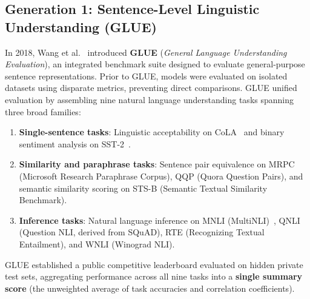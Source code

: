 \documentclass[../../../main.tex]{subfiles}
\begin{document}
\subsection{Generation 1: Sentence-Level Linguistic Understanding (GLUE)}
\label{subsec:glue_benchmark}

In 2018, Wang et al.~\cite{wang2018glue} introduced \textbf{GLUE} (\textit{General Language Understanding Evaluation}), an integrated benchmark suite designed to evaluate general-purpose sentence representations. Prior to GLUE, models were evaluated on isolated datasets using disparate metrics, preventing direct comparisons. GLUE unified evaluation by assembling nine natural language understanding tasks spanning three broad families:
\begin{enumerate}
    \item \textbf{Single-sentence tasks}: Linguistic acceptability on CoLA~\cite{warstadt2019cola} and binary sentiment analysis on SST-2~\cite{socher2013sst}.
    \item \textbf{Similarity and paraphrase tasks}: Sentence pair equivalence on MRPC (Microsoft Research Paraphrase Corpus), QQP (Quora Question Pairs), and semantic similarity scoring on STS-B (Semantic Textual Similarity Benchmark).
    \item \textbf{Inference tasks}: Natural language inference on MNLI (MultiNLI)~\cite{williams2018multinli}, QNLI (Question NLI, derived from SQuAD), RTE (Recognizing Textual Entailment), and WNLI (Winograd NLI).
\end{enumerate}
GLUE established a public competitive leaderboard evaluated on hidden private test sets, aggregating performance across all nine tasks into a \textbf{single summary score} (the unweighted average of task accuracies and correlation coefficients).
\end{document}
